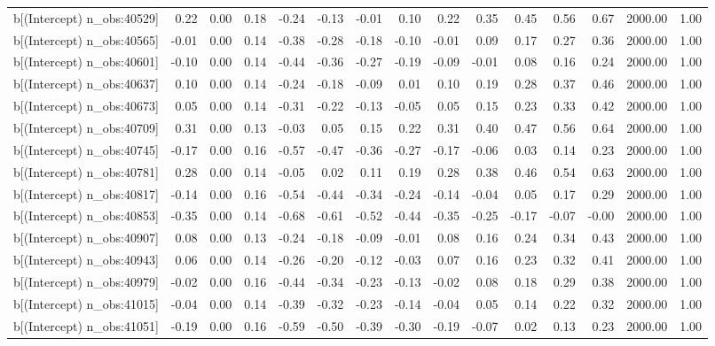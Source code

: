 \begin{table}[ht]
\begin{tabular}{rrrrrrrrrrrrrrr}
  b[(Intercept) n\_obs:40529] & 0.22 & 0.00 & 0.18 & -0.24 & -0.13 & -0.01 & 0.10 & 0.22 & 0.35 & 0.45 & 0.56 & 0.67 & 2000.00 & 1.00 \\ 
  b[(Intercept) n\_obs:40565] & -0.01 & 0.00 & 0.14 & -0.38 & -0.28 & -0.18 & -0.10 & -0.01 & 0.09 & 0.17 & 0.27 & 0.36 & 2000.00 & 1.00 \\ 
  b[(Intercept) n\_obs:40601] & -0.10 & 0.00 & 0.14 & -0.44 & -0.36 & -0.27 & -0.19 & -0.09 & -0.01 & 0.08 & 0.16 & 0.24 & 2000.00 & 1.00 \\ 
  b[(Intercept) n\_obs:40637] & 0.10 & 0.00 & 0.14 & -0.24 & -0.18 & -0.09 & 0.01 & 0.10 & 0.19 & 0.28 & 0.37 & 0.46 & 2000.00 & 1.00 \\ 
  b[(Intercept) n\_obs:40673] & 0.05 & 0.00 & 0.14 & -0.31 & -0.22 & -0.13 & -0.05 & 0.05 & 0.15 & 0.23 & 0.33 & 0.42 & 2000.00 & 1.00 \\ 
  b[(Intercept) n\_obs:40709] & 0.31 & 0.00 & 0.13 & -0.03 & 0.05 & 0.15 & 0.22 & 0.31 & 0.40 & 0.47 & 0.56 & 0.64 & 2000.00 & 1.00 \\ 
  b[(Intercept) n\_obs:40745] & -0.17 & 0.00 & 0.16 & -0.57 & -0.47 & -0.36 & -0.27 & -0.17 & -0.06 & 0.03 & 0.14 & 0.23 & 2000.00 & 1.00 \\ 
  b[(Intercept) n\_obs:40781] & 0.28 & 0.00 & 0.14 & -0.05 & 0.02 & 0.11 & 0.19 & 0.28 & 0.38 & 0.46 & 0.54 & 0.63 & 2000.00 & 1.00 \\ 
  b[(Intercept) n\_obs:40817] & -0.14 & 0.00 & 0.16 & -0.54 & -0.44 & -0.34 & -0.24 & -0.14 & -0.04 & 0.05 & 0.17 & 0.29 & 2000.00 & 1.00 \\ 
  b[(Intercept) n\_obs:40853] & -0.35 & 0.00 & 0.14 & -0.68 & -0.61 & -0.52 & -0.44 & -0.35 & -0.25 & -0.17 & -0.07 & -0.00 & 2000.00 & 1.00 \\ 
  b[(Intercept) n\_obs:40907] & 0.08 & 0.00 & 0.13 & -0.24 & -0.18 & -0.09 & -0.01 & 0.08 & 0.16 & 0.24 & 0.34 & 0.43 & 2000.00 & 1.00 \\ 
  b[(Intercept) n\_obs:40943] & 0.06 & 0.00 & 0.14 & -0.26 & -0.20 & -0.12 & -0.03 & 0.07 & 0.16 & 0.23 & 0.32 & 0.41 & 2000.00 & 1.00 \\ 
  b[(Intercept) n\_obs:40979] & -0.02 & 0.00 & 0.16 & -0.44 & -0.34 & -0.23 & -0.13 & -0.02 & 0.08 & 0.18 & 0.29 & 0.38 & 2000.00 & 1.00 \\ 
  b[(Intercept) n\_obs:41015] & -0.04 & 0.00 & 0.14 & -0.39 & -0.32 & -0.23 & -0.14 & -0.04 & 0.05 & 0.14 & 0.22 & 0.32 & 2000.00 & 1.00 \\ 
  b[(Intercept) n\_obs:41051] & -0.19 & 0.00 & 0.16 & -0.59 & -0.50 & -0.39 & -0.30 & -0.19 & -0.07 & 0.02 & 0.13 & 0.23 & 2000.00 & 1.00 \\ 

\end{tabular}
\end{table}

